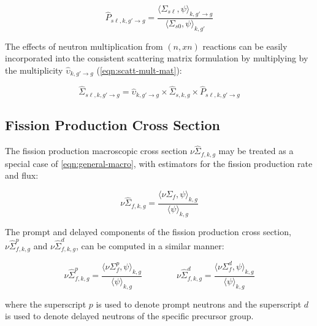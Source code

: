 \begin{equation}
\label{eqn:scatt-prob-mat}
\hat{P}_{s\ell,k,g'\rightarrow g} = \frac{{\langle \Sigma_{s\ell}, \psi \rangle}_{k,g'\rightarrow g}}{{\langle \Sigma_{s0}, \psi \rangle}_{k,g'}}
\end{equation}

The effects of neutron multiplication from $(n,xn)$ reactions can be easily incorporated into the consistent scattering matrix formulation by multiplying by the multiplicity $\hat{\upsilon}_{k,g'\rightarrow g}$ (\cref{eqn:scatt-mult-mat}):

\begin{equation}
\label{eqn:nuscatt-mat-consistent}
\hat{\Sigma}_{s\ell,k,g'\rightarrow g} = \hat{\upsilon}_{k,g'\rightarrow g} \times \hat{\Sigma}_{s,k,g} \times \hat{P}_{s\ell,k,g'\rightarrow g}
\end{equation}

\subsection{Fission Production Cross Section}
\label{subsubsec:tally-types-fiss-prod}

The fission production macroscopic cross section $\nu\hat{\Sigma}_{f,k,g}$ may be treated as a special case of \cref{eqn:general-macro}, with estimators for the fission production rate and flux:

\begin{equation}
\label{eqn:nu-fiss-macro}
\nu\hat{\Sigma}_{f,k,g} = \frac{\langle \nu\Sigma_{f}, \psi \rangle_{k,g}}{\langle \psi \rangle_{k,g}}
\end{equation}

\noindent The prompt and delayed components of the fission production cross section, $\nu\hat{\Sigma}_{f,k,g}^{p}$ and $\nu\hat{\Sigma}_{f,k,g}^{d}$, can be computed in a similar manner:

\begin{equation}
\label{eqn:nu-fiss-macro-specific}
\nu\hat{\Sigma}_{f,k,g}^{p} = \frac{\langle \nu\Sigma_{f}^{p}, \psi \rangle_{k,g}}{\langle \psi \rangle_{k,g}} \qquad \qquad \nu\hat{\Sigma}_{f,k,g}^{d} = \frac{\langle \nu\Sigma_{f}^{d}, \psi \rangle_{k,g}}{\langle \psi \rangle_{k,g}}
\end{equation}

\noindent where the superscript $p$ is used to denote prompt neutrons and the superscript $d$ is used to denote delayed neutrons of the specific precursor group.


